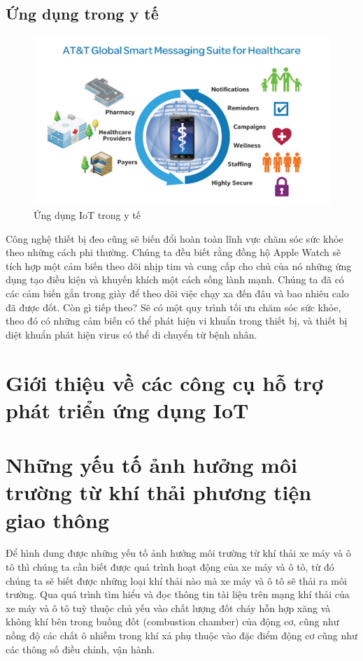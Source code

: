 \subsection*{Ứng dụng trong y tế}
\begin{figure}[htbp!] 
\centering    
\includegraphics[width=1\textwidth]{pic11}
\caption[Ứng dụng IoT trong y tế ]{Ứng dụng IoT trong y tế}
\label{fig:pic11}
\end{figure}
Công nghệ thiết bị đeo cũng sẽ biến đổi hoàn toàn lĩnh vực chăm sóc sức khỏe theo những cách phi thường. Chúng ta đều biết rằng đồng hộ Apple Watch sẽ tích hợp một cảm biến theo dõi nhịp tim và cung cấp cho chủ của nó những ứng dụng tạo điều kiện và khuyến khích một cách sống lành mạnh. Chúng ta đã có các cảm biến gắn trong giày để theo dõi việc chạy xa đến đâu và bao nhiêu calo đã được đốt. Còn gì tiếp theo? Sẽ có một quy trình tối ưu chăm sóc sức khỏe, theo đó có những cảm biến có thể phát hiện vi khuẩn trong thiết bị, và thiết bị diệt khuẩn phát hiện virus có thể di chuyển từ bệnh nhân.


\section{Giới thiệu về các công cụ hỗ trợ phát triển ứng dụng IoT}




\section{Những yếu tố ảnh hưởng môi trường từ khí thải phương tiện giao thông}
Để hình dung được những yếu tố ảnh hưởng môi trường từ khí thải xe máy và ô tô thì chúng ta cần biết được quá trình hoạt động của xe máy và ô tô, từ đó chúng ta sẽ biết được những loại khí thải nào mà xe máy và ô tô sẽ thải ra môi trường. Qua quá trình tìm hiểu và đọc thông tin tài liệu trên mạng khí thải của xe máy và ô tô tuỳ thuộc chủ yếu vào chất lượng đốt cháy hỗn hợp xăng và không khí bên trong buồng đốt (combustion chamber) của động cơ, cũng như nồng độ các chất ô nhiễm trong khí xả phụ thuộc vào đặc điểm động cơ cũng như các thông số điều chỉnh, vận hành.

